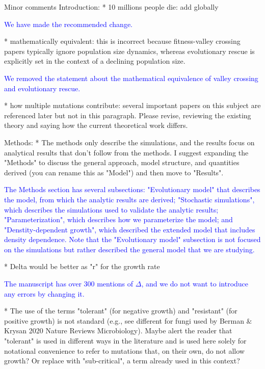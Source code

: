 \documentclass[12pt]{extarticle}
\begin{document}
Minor comments
Introduction:
* 10 millions people die: add globally

\textcolor{blue}{We have made the recommended change. }  %

* mathematically equivalent: this is incorrect because fitness-valley crossing papers typically ignore population size dynamics, whereas evolutionary rescue is explicitly set in the context of a declining population size.

\textcolor{blue}{We removed the statement about the mathematical equivalence of valley crossing and evolutionary rescue.}

* how multiple mutations contribute: several important papers on this subject are referenced later but not in this paragraph. Please revise, reviewing the existing theory and saying how the current theoretical work differs.

Methods:
* The methods only describe the simulations, and the results focus on analytical results that don't follow from the methods. I suggest expanding the "Methods" to discuss the general approach, model structure, and quantities derived (you can rename this as "Model") and then move to "Results".

\textcolor{blue}{
The Methods section has several subsections: "Evolutionary model" that describes the model, from which the analytic results are derived; "Stochastic simulations", which describes the simulations used to validate the analytic results; "Parameterization", which describes how we parameterize the model; and "Denstity-dependent growth", which described the extended model that includes density dependence. Note that the "Evolutionary model" subsection is not focused on the simulations but rather described the general model that we are studying.} 

* Delta would be better as "r" for the growth rate

\textcolor{blue}{The manuscript has over 300 mentions of $\Delta$, and we do not want to introduce any errors by changing it.}

* The use of the terms "tolerant" (for negative growth) and "resistant" (for positive growth) is not standard (e.g., see different for fungi used by Berman $\&$ Krysan 2020 Nature Reviews Microbiology). Maybe alert the reader that "tolerant" is used in different ways in the literature and is used here solely for notational convenience to refer to mutations that, on their own, do not allow growth? Or replace with "sub-critical", a term already used in this context?
\end{document}
